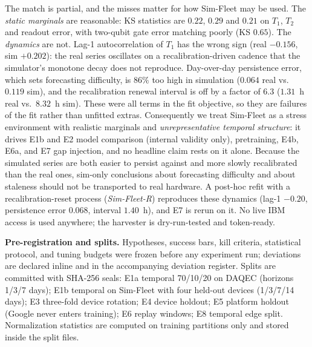 \documentclass[journal]{IEEEtran}
\begin{document}
The match is partial, and the misses matter for how Sim-Fleet may be used. The
\emph{static marginals} are reasonable: KS statistics are $0.22$, $0.29$ and $0.21$
on $T_1$, $T_2$ and readout error, with two-qubit gate error matching poorly
(KS $0.65$). The \emph{dynamics} are not. Lag-1 autocorrelation of $T_1$ has the
wrong sign (real $-0.156$, sim $+0.202$): the real series oscillates on a
recalibration-driven cadence that the simulator's monotone decay does not reproduce.
Day-over-day persistence error, which sets forecasting difficulty, is $86\%$ too high
in simulation ($0.064$ real vs.\ $0.119$ sim), and the recalibration renewal interval
is off by a factor of $6.3$ ($1.31$~h real vs.\ $8.32$~h sim). These were all terms
in the fit objective, so they are failures of the fit rather than unfitted extras.
Consequently we treat Sim-Fleet as a stress environment with realistic marginals and
\emph{unrepresentative temporal structure}: it drives E1b and E2 model comparison
(internal validity only), pretraining, E4b, E6a, and E7 gap injection, and no
headline claim rests on it alone. Because the simulated series are both easier to
persist against and more slowly recalibrated than the real ones, sim-only conclusions
about forecasting difficulty and about staleness should not be transported to real
hardware. A post-hoc refit with a recalibration-reset process (\emph{Sim-Fleet-R}) reproduces
these dynamics (lag-1 $-0.20$, persistence error $0.068$, interval $1.40$~h), and E7 is
rerun on it. No live IBM access is used anywhere; the harvester is dry-run-tested and
token-ready.

% 

\textbf{Pre-registration and splits.} Hypotheses, success bars, kill criteria,
statistical protocol, and tuning budgets were frozen before any experiment run;
deviations are declared inline and in the accompanying deviation register. Splits are
committed with SHA-256
seals: E1a temporal 70/10/20 on DAQEC (horizons 1/3/7 days); E1b temporal on
Sim-Fleet with four held-out devices (1/3/7/14 days); E3 three-fold device
rotation; E4 device holdout; E5 platform holdout (Google never enters training);
E6 replay windows; E8 temporal edge split. Normalization statistics are computed
on training partitions only and stored inside the split files.
\end{document}
